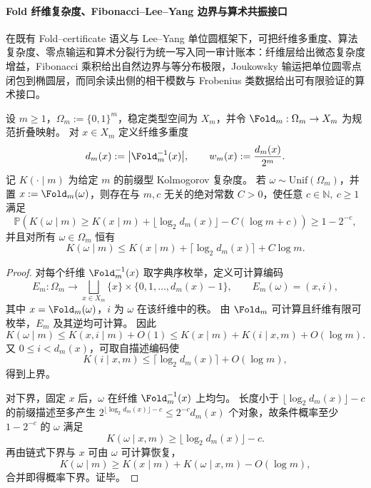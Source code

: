 \paragraph{Fold 纤维复杂度、Fibonacci--Lee--Yang 边界与算术共振接口}
在既有 Fold--certificate 语义与 Lee--Yang 单位圆框架下，可把纤维多重度、算法复杂度、零点输运和算术分裂行为统一写入同一审计账本：纤维层给出微态复杂度增益，Fibonacci 乘积给出自然边界与等分布极限，Joukowsky 输运把单位圆零点闭包到椭圆层，而同余读出侧的相干模数与 Frobenius 类数据给出可有限验证的算术接口。

\begin{theorem}\label{thm:xi-fold-algorithmic-holographic-ledger}
设 \(m\ge 1\)，\(\Omega_m:=\{0,1\}^m\)，稳定类型空间为 \(X_m\)，并令
\(
\Fold_m:\Omega_m\to X_m
\)
为规范折叠映射。
对 \(x\in X_m\) 定义纤维多重度
\[
d_m(x):=\bigl|\Fold_m^{-1}(x)\bigr|,
\qquad
w_m(x):=\frac{d_m(x)}{2^m}.
\]
记 \(K(\cdot\mid m)\) 为给定 \(m\) 的前缀型 Kolmogorov 复杂度。
若 \(\omega\sim\mathrm{Unif}(\Omega_m)\)，并置 \(x:=\Fold_m(\omega)\)，则存在与 \(m,c\) 无关的绝对常数 \(C>0\)，使任意 \(c\in\mathbb N,\ c\ge 1\) 满足
\[
\mathbb P\!\left(
K(\omega\mid m)\ge K(x\mid m)+\lfloor\log_2 d_m(x)\rfloor-C(\log m+c)
\right)\ge 1-2^{-c},
\]
并且对所有 \(\omega\in\Omega_m\) 恒有
\[
K(\omega\mid m)\le K(x\mid m)+\lceil\log_2 d_m(x)\rceil+C\log m.
\]
\end{theorem}
\begin{proof}
对每个纤维 \(\Fold_m^{-1}(x)\) 取字典序枚举，定义可计算编码
\[
E_m:\Omega_m\to\bigsqcup_{x\in X_m}\{x\}\times\{0,1,\dots,d_m(x)-1\},
\qquad
E_m(\omega)=(x,i),
\]
其中 \(x=\Fold_m(\omega)\)，\(i\) 为 \(\omega\) 在该纤维中的秩。
由 \(\Fold_m\) 可计算且纤维有限可枚举，\(E_m\) 及其逆均可计算。
因此
\[
K(\omega\mid m)\le K(x,i\mid m)+O(1)
\le K(x\mid m)+K(i\mid x,m)+O(\log m).
\]
又 \(0\le i<d_m(x)\)，可取自描述编码使
\[
K(i\mid x,m)\le \lceil\log_2 d_m(x)\rceil+O(\log m),
\]
得到上界。

对下界，固定 \(x\) 后，\(\omega\) 在纤维 \(\Fold_m^{-1}(x)\) 上均匀。
长度小于 \(\lfloor\log_2 d_m(x)\rfloor-c\) 的前缀描述至多产生
\(
2^{\lfloor\log_2 d_m(x)\rfloor-c}\le 2^{-c}d_m(x)
\)
个对象，故条件概率至少 \(1-2^{-c}\) 的 \(\omega\) 满足
\[
K(\omega\mid x,m)\ge \lfloor\log_2 d_m(x)\rfloor-c.
\]
再由链式下界与 \(x\) 可由 \(\omega\) 可计算恢复，
\[
K(\omega\mid m)\ge K(x\mid m)+K(\omega\mid x,m)-O(\log m),
\]
合并即得概率下界。证毕。
\end{proof}

